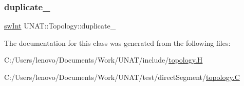 \mbox{\label{classUNAT_1_1Topology_a03127a5903fda91acde275524b2bf6c7}} 
\subsubsection{\texorpdfstring{duplicate\_}{duplicate\_}}
{\footnotesize\ttfamily \mbox{\hyperlink{include_2swMacro_8h_a113cf5f6b5377cdf3fac6aa4e443e9aa}{sw\+Int}} U\+N\+A\+T\+::\+Topology\+::duplicate\+\_\+\hspace{0.3cm}{\ttfamily [private]}}



The documentation for this class was generated from the following files\+:\begin{DoxyCompactItemize}
\item 
C\+:/\+Users/lenovo/\+Documents/\+Work/\+U\+N\+A\+T/include/\mbox{\hyperlink{include_2topology_8H}{topology.\+H}}\item 
C\+:/\+Users/lenovo/\+Documents/\+Work/\+U\+N\+A\+T/test/direct\+Segment/\mbox{\hyperlink{test_2directSegment_2topology_8C}{topology.\+C}}\end{DoxyCompactItemize}
